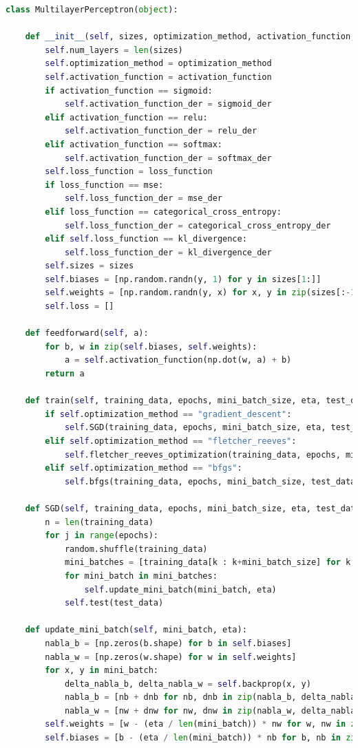 \documentclass[a4paper, 14pt]{extarticle}
\begin{document}
\begin{lstlisting}[language={python},caption={Многослойный персептрон},label={lst:code1}]
class MultilayerPerceptron(object):

    def __init__(self, sizes, optimization_method, activation_function, loss_function):
        self.num_layers = len(sizes)
        self.optimization_method = optimization_method
        self.activation_function = activation_function
        if activation_function == sigmoid:
            self.activation_function_der = sigmoid_der
        elif activation_function == relu:
            self.activation_function_der = relu_der
        elif activation_function == softmax:
            self.activation_function_der = softmax_der
        self.loss_function = loss_function
        if loss_function == mse:
            self.loss_function_der = mse_der
        elif loss_function == categorical_cross_entropy:
            self.loss_function_der = categorical_cross_entropy_der
        elif self.loss_function == kl_divergence:
            self.loss_function_der = kl_divergence_der
        self.sizes = sizes
        self.biases = [np.random.randn(y, 1) for y in sizes[1:]]
        self.weights = [np.random.randn(y, x) for x, y in zip(sizes[:-1], sizes[1:])]
        self.loss = []

    def feedforward(self, a):
        for b, w in zip(self.biases, self.weights):
            a = self.activation_function(np.dot(w, a) + b)
        return a

    def train(self, training_data, epochs, mini_batch_size, eta, test_data):
        if self.optimization_method == "gradient_descent":
            self.SGD(training_data, epochs, mini_batch_size, eta, test_data)
        elif self.optimization_method == "fletcher_reeves":
            self.fletcher_reeves_optimization(training_data, epochs, mini_batch_size, eta, test_data)
        elif self.optimization_method == "bfgs":
            self.bfgs(training_data, epochs, mini_batch_size, test_data)

    def SGD(self, training_data, epochs, mini_batch_size, eta, test_data):
        n = len(training_data)
        for j in range(epochs):
            random.shuffle(training_data)
            mini_batches = [training_data[k : k+mini_batch_size] for k in range(0, n, mini_batch_size)]
            for mini_batch in mini_batches:
                self.update_mini_batch(mini_batch, eta)
            self.test(test_data)

    def update_mini_batch(self, mini_batch, eta):
        nabla_b = [np.zeros(b.shape) for b in self.biases]
        nabla_w = [np.zeros(w.shape) for w in self.weights]
        for x, y in mini_batch:
            delta_nabla_b, delta_nabla_w = self.backprop(x, y)
            nabla_b = [nb + dnb for nb, dnb in zip(nabla_b, delta_nabla_b)]
            nabla_w = [nw + dnw for nw, dnw in zip(nabla_w, delta_nabla_w)]
        self.weights = [w - (eta / len(mini_batch)) * nw for w, nw in zip(self.weights, nabla_w)]
        self.biases = [b - (eta / len(mini_batch)) * nb for b, nb in zip(self.biases, nabla_b)]


\end{lstlisting}
\end{document}
